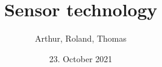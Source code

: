 \documentclass{beamer}
\date{23. October 2021}
\title{Sensor technology}
\author{Arthur, Roland, Thomas}
\begin{document}
\begin{frame}
    \titlepage
\end{frame}










\end{document}
